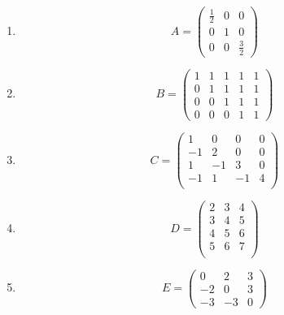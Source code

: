 \begin{enumerate}
\item
    $$A=\begin{pmatrix}
       \frac{1}{2} & 0 & 0 \\
       0 & 1 & 0 \\
       0 & 0 & \frac{3}{2}
    \end{pmatrix}$$

\item
    $$B=\begin{pmatrix}
       1 & 1 & 1 & 1 & 1 \\
       0 & 1 & 1 & 1 & 1 \\
       0 & 0 & 1 & 1 & 1 \\
       0 & 0 & 0 & 1 & 1
    \end{pmatrix}$$

\item
    $$C=\begin{pmatrix}
       1 & 0 & 0 & 0 \\
       -1 & 2 & 0 & 0 \\
       1 & -1 & 3 & 0 \\
       -1 & 1 & -1 & 4 \\
    \end{pmatrix}$$

\item
    $$D=\begin{pmatrix}
       2 & 3 & 4 \\
       3 & 4 & 5 \\
       4 & 5 & 6 \\
       5 & 6 & 7 \\
    \end{pmatrix}$$

\item
  $$E=\begin{pmatrix}
       0 & 2 & 3 \\
       -2 & 0 & 3 \\
       -3 & -3 & 0
    \end{pmatrix}$$
\end{enumerate}

